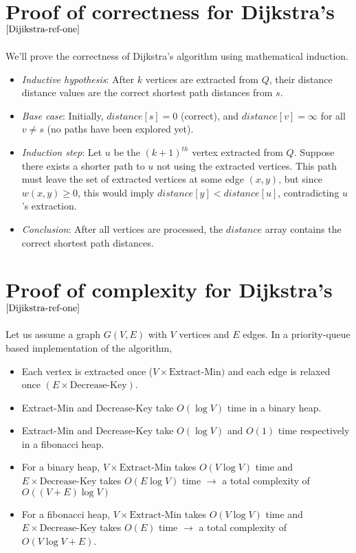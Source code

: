 \begin{appendices}
	\section{Proof of correctness for Dijkstra's$^{\cite{Dijikstra-ref-one}}$}\label{appendix:dijkstra:correctness}
	We'll prove the correctness of Dijkstra's algorithm using mathematical induction.
	\begin{itemize}
		\item \textit{Inductive hypothesis}: After $k$ vertices are extracted from $Q$, their distance distance values are the correct shortest path distances from $s$.
		\item \textit{Base case}: Initially, $distance[s]=0$ (correct), and $distance[v]=\infty$ for all $v \neq s$ (no paths have been explored yet).
		\item \textit{Induction step}: Let $u$ be the $(k+1)^{th}$ vertex extracted from $Q$. Suppose there exists a shorter path to $u$ not using the extracted vertices. This path must leave the set of extracted vertices at some edge $(x,y)$, but since $w(x,y) \geq 0$, this would imply $distance[y]<distance[u]$, contradicting $u$’s extraction.
		\item \textit{Conclusion}: After all vertices are processed, the $distance$ array contains the correct shortest path distances.
	\end{itemize}
	\section{Proof of complexity for Dijkstra's $^{\cite{Dijikstra-ref-one}}$}\label{appendix:dijkstra:complexity}
	Let us assume a graph $G(V, E)$ with $V$ vertices and $E$ edges. In a priority-queue based implementation of the algorithm,
	\begin{itemize}
		\item Each vertex is extracted once ($V \times \mbox{Extract-Min})$ and each edge is relaxed once $(E \times \mbox{Decrease-Key})$.
		\item Extract-Min and Decrease-Key take $O(\log{V})$ time in a binary heap.
		\item Extract-Min and Decrease-Key take $O(\log{V})$ and $O(1)$ time respectively in a fibonacci heap.
		\item For a binary heap, $V \times \mbox{Extract-Min}$ takes $O(V\log{V})$ time and $E \times \mbox{Decrease-Key}$ takes $O(E\log{V})$ time $\to$ a total complexity of $O((V + E)\log{V})$
		\item For a fibonacci heap, $V \times \mbox{Extract-Min}$ takes $O(V\log{V})$ time and $E \times \mbox{Decrease-Key}$ takes $O(E)$ time $\to$ a total complexity of $O(V\log{V} + E)$.
	\end{itemize}

\end{appendices}
